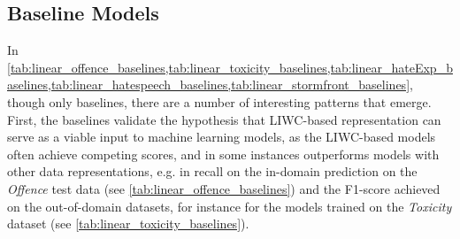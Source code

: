 \subsection{Baseline Models}
In \cref{tab:linear_offence_baselines,tab:linear_toxicity_baselines,tab:linear_hateExp_baselines,tab:linear_hatespeech_baselines,tab:linear_stormfront_baselines}, though only baselines, there are a number of interesting patterns that emerge.
First, the baselines validate the hypothesis that LIWC-based representation can serve as a viable input to machine learning models, as the LIWC-based models often achieve competing scores, and in some instances outperforms models with other data representations, e.g. in recall on the in-domain prediction on the \textit{Offence} test data (see \cref{tab:linear_offence_baselines}) and the F1-score achieved on the out-of-domain datasets, for instance for the models trained on the \textit{Toxicity} dataset (see \cref{tab:linear_toxicity_baselines}).



